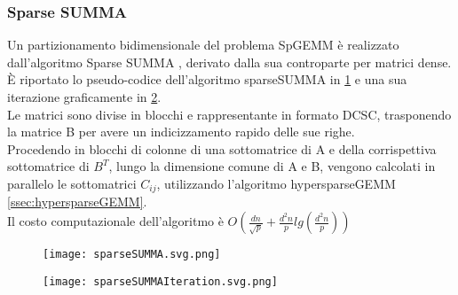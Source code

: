 \subsubsection{Sparse SUMMA}
Un partizionamento bidimensionale del problema SpGEMM è realizzato
dall'algoritmo Sparse SUMMA \parencite{sparseSUMMA}, derivato dalla sua
controparte per matrici dense.\\
È riportato lo pseudo-codice dell'algoritmo sparseSUMMA 
in \ref{figCode:sparseSUMMA} e una sua iterazione graficamente in
\ref{fig:sparseSUMMAIteration}.\\
Le matrici sono divise in blocchi e rappresentante in formato DCSC,
trasponendo la matrice B per avere un indicizzamento rapido delle sue righe.\\
Procedendo in blocchi di colonne di una sottomatrice di A e della corrispettiva
sottomatrice di $B^T$, lungo la dimensione comune di A e B,
vengono calcolati in parallelo le sottomatrici $C_{ij}$, 
utilizzando l'algoritmo hypersparseGEMM \ref{ssec:hypersparseGEMM}.\\
Il costo computazionale dell'algoritmo è 
$O(\frac{dn}{\sqrt{p}}+\frac{d^2n}{p}lg(\frac{d^2n}{p}))$
\begin{figure}[h]
  \caption[SparseSUMMA, per una risoluzione parallela di SpGEMM con un partizionamento 2D]
  \centering \texttt{[image: sparseSUMMA.svg.png]} \decoRule \label{figCode:sparseSUMMA}
\end{figure}
\begin{figure}[h]
  \caption[esecuzione di un iterazione dell'algoritmo sparseSUMMA]
  \centering \texttt{[image: sparseSUMMAIteration.svg.png]} \decoRule \label{fig:sparseSUMMAIteration}
\end{figure}

